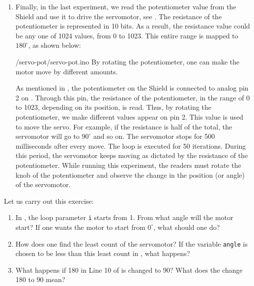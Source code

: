 \begin{enumerate}
  \item Finally, in the last experiment, we read the potentiometer value
        from the Shield and use it to drive the servomotor, see
        .  The resistance of the potentiometer is
        represented in 10 bits.  As a result, the resistance value could be
        any one of 1024 values, from 0 to 1023.  This entire range is
        mapped to $180^\circ$, as shown below:
        
        {\LocSERardcode/servo-pot/servo-pot.ino}
        By rotating the potentiometer, one can make
        the motor move by different amounts.
        
        As mentioned in , the potentiometer on the Shield is connected 
        to analog pin 2 on \arduino. Through this pin, the resistance of the potentiometer, in the range of 0 to 1023,
        depending on its position, is read.  Thus, by rotating the
        potentiometer, we make different values appear on pin 2.  This value
        is used to move the servo.  For example, if the resistance is half
        of the total, the servomotor will go to $90^\circ$ and so on.  The
        servomotor stops for 500 milliseconds after every move.  The loop is
        executed for 50 iterations. During this period, the servomotor keeps moving as dictated by the
        resistance of the potentiometer. While running this experiment, the readers 
        must rotate the knob of the potentiometer and observe 
        the change in the position (or angle) of the servomotor.   
        
\end{enumerate}

\begin{exercise}
  Let us carry out this exercise:
  \begin{enumerate}
    \item In , the loop parameter {\tt i} starts
          from 1.  From what angle will the motor start?  If one wants the
          motor to start from $0^\circ$, what should one do?
    \item How does one find the least count of the servomotor?  If the
          variable {\tt angle} is chosen to be less than this least count in
          , what happens?
    \item What happens if 180 in Line 10 of  is
          changed to 90?  What does the change 180 to 90 mean?
  \end{enumerate}
\end{exercise}

